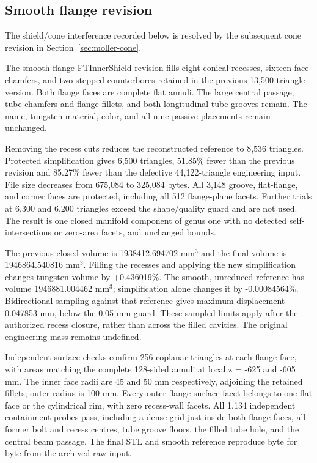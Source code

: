 \FloatBarrier
\subsection{Smooth flange revision}
\label{sec:ft-shield-smooth}

The shield/cone interference recorded below is resolved by the subsequent cone revision in
Section~\ref{sec:moller-cone}.

The smooth-flange FTInnerShield revision fills eight conical recesses, sixteen face chamfers, and two
stepped counterbores retained in the previous 13,500-triangle version. Both flange faces are complete flat
annuli. The large central passage, tube chamfers and flange fillets, and both longitudinal tube grooves
remain. The name, tungsten material, color, and all nine passive placements remain unchanged.

Removing the recess cuts reduces the reconstructed reference to 8,536 triangles. Protected simplification
gives 6,500 triangles, 51.85\% fewer than the previous revision and 85.27\% fewer than the defective
44,122-triangle engineering input. File size decreases from 675,084 to 325,084 bytes. All 3,148 groove,
flat-flange, and corner faces are protected, including all 512 flange-plane facets. Further trials at 6,300
and 6,200 triangles exceed the shape/quality guard and are not used. The result is one closed manifold
component of genus one with no detected self-intersections or zero-area facets, and unchanged bounds.

The previous closed volume is 1938412.694702 mm$^3$ and the final volume is 1946864.540816 mm$^3$. Filling
the recesses and applying the new simplification changes tungsten volume by +0.436019\%. The smooth,
unreduced reference has volume 1946881.004462 mm$^3$; simplification alone changes it by -0.00084564\%.
Bidirectional sampling against that reference gives maximum displacement 0.047853 mm, below the 0.05 mm
guard. These sampled limits apply after the authorized recess closure, rather than across the filled
cavities. The original engineering mass remains undefined.

Independent surface checks confirm 256 coplanar triangles at each flange face, with areas matching the
complete 128-sided annuli at local z = -625 and -605 mm. The inner face radii are 45 and 50 mm respectively,
adjoining the retained fillets; outer radius is 100 mm. Every outer flange surface facet belongs to one flat
face or the cylindrical rim, with zero recess-wall facets. All 1,134 independent containment probes pass,
including a dense grid just inside both flange faces, all former bolt and recess centres, tube groove
floors, the filled tube hole, and the central beam passage. The final STL and smooth reference reproduce
byte for byte from the archived raw input.

